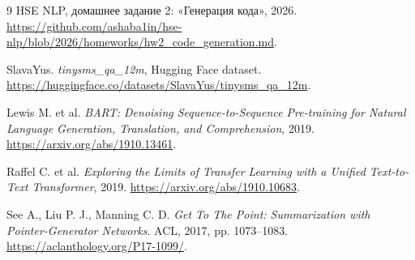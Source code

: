 \begingroup\small
\begin{thebibliography}{9}
\setlength{\itemsep}{2pt}
HSE NLP, домашнее задание 2: «Генерация кода», 2026.
\url{https://github.com/ashaba1in/hse-nlp/blob/2026/homeworks/hw2_code_generation.md}.

SlavaYus. \emph{tinysms\_qa\_12m}, Hugging Face dataset.
\url{https://huggingface.co/datasets/SlavaYus/tinysms_qa_12m}.

Lewis M. et al. \emph{BART: Denoising Sequence-to-Sequence Pre-training
for Natural Language Generation, Translation, and Comprehension}, 2019.
\url{https://arxiv.org/abs/1910.13461}.

Raffel C. et al. \emph{Exploring the Limits of Transfer Learning with a
Unified Text-to-Text Transformer}, 2019.
\url{https://arxiv.org/abs/1910.10683}.

See A., Liu P. J., Manning C. D. \emph{Get To The Point: Summarization
with Pointer-Generator Networks}. ACL, 2017, pp. 1073--1083.
\url{https://aclanthology.org/P17-1099/}.
\end{thebibliography}
\endgroup
